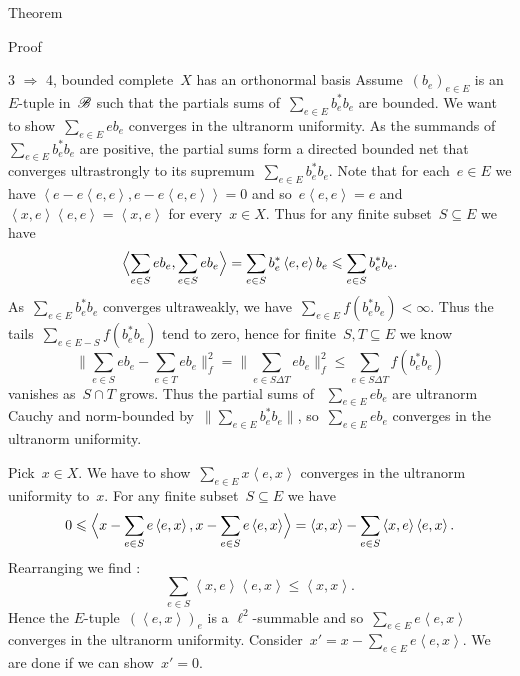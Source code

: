 \documentclass[b]{subfiles}
\begin{document}
\begin{parsec}
\begin{point}{Theorem}
\begin{point}{Proof}
\begin{point}{3
    $\Rightarrow$ 4, bounded complete~$X$ has an orthonormal basis}
Assume~$(b_e)_{e \in E}$ is an~$E$-tuple in~$\scrB$
such that the partials sums of~$\sum_{e \in E} b_e^*b_e$ are bounded.
We want to show~$\sum_{e \in E} e b_e$ converges in the ultranorm
    uniformity.
As the summands of~$\sum_{e \in E}b_e^*b_e$ are positive,
    the partial sums form a directed bounded net
    that converges ultrastrongly
    to its supremum~$\sum_{e \in E} b_e^*b_e$.
Note that for each~$e \in E$
we have
$\left<e-e\left<e,e\right>,e-e\left<e,e\right>\right> = 0$
and so~$e \left<e,e\right> = e$
and~$\left<x,e\right>\left<e,e\right> = \left<x,e\right>$
for every~$x \in X$.
Thus for any finite subset~$S \subseteq E$
we have
\begin{equation*}
    \Bigl<\sum_{e \in S} eb_e, \sum_{e \in S} eb_e\Bigr>
    = \sum_{e \in S} b_e^* \left<e,e\right>b_e \leq \sum_{e \in S} b_e^*b_e.
\end{equation*}
As~$\sum_{e \in E} b^*_eb_e$ converges ultraweakly,
we have~$\sum_{e \in E} f(b^*_eb_e) < \infty$.
Thus the tails~$\sum_{e \in E - S} f(b_e^*b_e)$ tend to zero, hence for finite~$S,T\subseteq E$ we know
\begin{equation*}
    \bigl\| \sum_{e \in S} eb_e - \sum_{e\in T} eb_e \bigr\|_f^2
        = \bigl\| \sum_{e \in S\Delta T} eb_e  \bigr\|_f^2
        \leq \sum_{e \in S\Delta T} f(b_e^*b_e)
\end{equation*}
vanishes as~$S \cap T$ grows.
Thus the partial sums of ~$\sum_{e \in E} eb_e$ are ultranorm Cauchy
and norm-bounded by~$\| \sum_{e \in E} b_e^*b_e \|$,
so~$\sum_{e \in E} eb_e$ converges in the ultranorm uniformity.

Pick~$x \in X$.
We have to show~$\sum_{e \in E} x\left<e,x\right>$
converges in the ultranorm uniformity to~$x$.
For any finite subset~$S \subseteq E$ we have
\begin{equation*}
    0 \leq \Bigl< x - \sum_{e \in S} e\left<e,x\right>,
        x - \sum_{e \in S} e\left<e,x\right> \Bigr>
        = \left<x,x\right> - \sum_{e \in S} \left<x,e\right>\left<e,x\right>.
\end{equation*}
Rearranging we find :
\begin{equation*}
\sum_{e \in S} \left<x,e\right>\left<e,x\right>
    \leq \left<x,x\right>.
\end{equation*}
Hence the $E$-tuple~$(\left<e,x\right>)_e$
is a $\ell^2$-summable
and so~$\sum_{e \in E} e \left<e,x\right>$
converges in the ultranorm uniformity.
Consider~$x' = x - \sum_{e \in E} e\left<e,x\right>$.
We are done if we can show~$x' = 0$.


\end{point}
\end{point}
\end{point}
\end{parsec}
\end{document}
